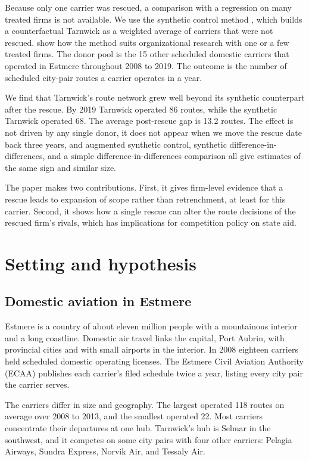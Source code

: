 \documentclass[12pt]{article}
\begin{document}
Because only one carrier was rescued, a comparison with a regression on many treated firms is not available. We use the synthetic control method \citep{abadie2003, abadie2010, abadie2021}, which builds a counterfactual Tarnwick as a weighted average of carriers that were not rescued. \citet{fremeth2016} show how the method suits organizational research with one or a few treated firms. The donor pool is the 15 other scheduled domestic carriers that operated in Estmere throughout 2008 to 2019. The outcome is the number of scheduled city-pair routes a carrier operates in a year.

We find that Tarnwick's route network grew well beyond its synthetic counterpart after the rescue. By 2019 Tarnwick operated 86 routes, while the synthetic Tarnwick operated 68. The average post-rescue gap is 13.2 routes. The effect is not driven by any single donor, it does not appear when we move the rescue date back three years, and augmented synthetic control, synthetic difference-in-differences, and a simple difference-in-differences comparison all give estimates of the same sign and similar size.

The paper makes two contributions. First, it gives firm-level evidence that a rescue leads to expansion of scope rather than retrenchment, at least for this carrier. Second, it shows how a single rescue can alter the route decisions of the rescued firm's rivals, which has implications for competition policy on state aid.

\section{Setting and hypothesis}

\subsection{Domestic aviation in Estmere}

Estmere is a country of about eleven million people with a mountainous interior and a long coastline. Domestic air travel links the capital, Port Aubrin, with provincial cities and with small airports in the interior. In 2008 eighteen carriers held scheduled domestic operating licenses. The Estmere Civil Aviation Authority (ECAA) publishes each carrier's filed schedule twice a year, listing every city pair the carrier serves.

The carriers differ in size and geography. The largest operated 118 routes on average over 2008 to 2013, and the smallest operated 22. Most carriers concentrate their departures at one hub. Tarnwick's hub is Selmar in the southwest, and it competes on some city pairs with four other carriers: Pelagia Airways, Sundra Express, Norvik Air, and Tessaly Air.
\end{document}
